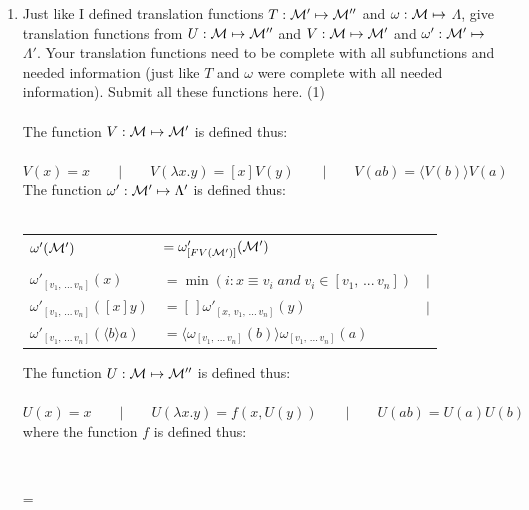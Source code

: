 \documentclass[11pt]{article}
\newenvironment{neverbreak} %
{\par\nobreak\vfil\penalty0\vfilneg
	\vtop\bgroup}
{\par\xdef\tpd{\the\prevdepth}\egroup
	\prevdepth=\tpd}
\begin{document}
\begin{enumerate}
  

      \item
        Just like I defined translation functions  $T:{\cal M}'\mapsto {\cal M}''$ and  $\omega: {\cal M}\mapsto$ $\Lambda$, give translation functions from
        $U:{\cal M}\mapsto {\cal M}''$ and  $V:{\cal M}\mapsto{\cal M}'$ and  $\omega':{\cal M}'\mapsto$ $\Lambda'$.   Your translation functions need to be complete with all subfunctions and needed information (just like $T$ and $\omega$ were complete with all needed information).   Submit all these functions here.
        \hfill{(1)} %
        \\
        \\
        The function $V:{\cal M}\mapsto{\cal M}'$ is defined thus:\\ \\
        $V(x) = x\qquad |\qquad V(\lambda x.y) = [x]V(y)\qquad |\qquad V(ab) = \langle V(b) \rangle V(a)$
   \vspace{1cm}\\
        The function $\omega':{\cal M}'\mapsto \Lambda'$ is defined thus:\\ \\
		\begin{tabular}{lll}
		$\omega'(\cal{M}')$&$ = \omega'_{[FV(\cal{M}')]}(\cal{M}')$\\ \\
        $\omega'_{[v_1,\,...\, v_n]} (x)$&$ = \min(i:x\equiv v_i\; and\; v_i \in [v_1,\, ...\, v_n])  $&$ |$ \\
        $\omega'_{[v_1,\,...\, v_n]}([x]y)$&$ = [\,]\omega'_{[x,\,v_1,\,...\, v_n]}(y) $&$ |$\\
        $\omega'_{[v_1,\,...\, v_n]}(\langle b\rangle a)$&$ = \langle\omega_{[v_1,\,...\, v_n]}(b)\rangle\omega_{[v_1,\,...\, v_n]}(a) $\\
		\end{tabular}
		\vspace{1cm} 
		\begin{neverbreak}
		The function $U:{\cal M}\mapsto {\cal M}''$ is defined thus: \\ \\
		$U(x) = x\qquad|\qquad U(\lambda x.y) = f(x, U(y)) \qquad|\qquad U(ab) = U(a)U(b)$ \\
		where the function $f$ is defined thus:\\ \\
		\begin{tabular}{lll}

\end{tabular}
\end{neverbreak}
\end{enumerate}
\end{document}
